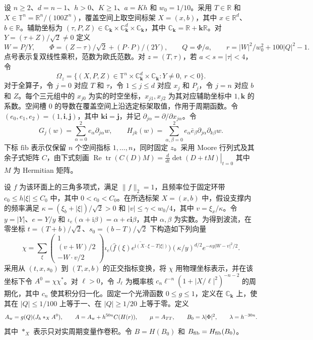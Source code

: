 设 $n\ge2$、$d=n-1$、$h>0$、$K\ge1$、$a=Kh$ 和 $w_0=1/10$。采用 $T\in\mathbb R$ 和 $X\in\mathbb T^n=\mathbb R^n/(100\mathbb Z^n)$，覆盖空间上取空间标架 $X=(x,b)$，其中 $x\in\mathbb R^d$、$b\in\mathbb R$。辅助坐标为 $(\tau,P,Z)\in\mathbb C_{\mathbf k}\times\mathbb C_{\mathbf k}^d\times\mathbb C_{\mathbf k}$，其中 $\mathbb C_{\mathbf k}=\mathbb R+\mathbf k\mathbb R$。对 $Y=(\tau+Z)/\sqrt2\ne0$ 定义
\[
 W=P/Y,\qquad \Phi=(Z-\tau)/\sqrt2+(P\cdot P)/(2Y),\qquad
 Q=\Phi/a,\qquad r=|W|^2/w_0^2+100|Q|^2-1 .
\]
点号表示复双线性乘积，范数为欧氏范数。对 $z=(T,\tau)$，若 $a<s=|\tau|<4$，令
\[
 \Omega_z=\{(X,P,Z)\in\mathbb T^n\times\mathbb C_{\mathbf k}^d\times\mathbb C_{\mathbf k}:Y\ne0,\ r<0\}.
\]
对于全算子，令 $j=0$ 对应 $T$ 和 $\tau$，令 $1\le j\le d$ 对应 $x_j$ 和 $P_j$，令 $j=n$ 对应 $b$ 和 $Z$。每个三元组中的 $x_{j0}$ 为实的时空坐标，$x_{j1},x_{j2}$ 为其对应辅助坐标中 $1,\mathbf k$ 的系数。空间槽 $0$ 的导数在覆盖空间上沿选定标架取值，作用于周期函数。令 $(e_0,e_1,e_2)=(1,\mathbf i,\mathbf j)$，其中 $\mathbf k\mathbf i=\mathbf j$，并记 $\partial_{j\alpha}=\partial/\partial x_{j\alpha}$。令
\[
 G_j(w)=\sum_{\alpha=0}^2 e_\alpha\partial_{j\alpha}w,\qquad
 H_{jk}(w)=\sum_{\alpha,\beta=0}^2 e_\alpha\bar e_\beta\partial_{j\alpha}\partial_{k\beta}w .
\]
下标 $\mathrm{fib}$ 表示仅保留 $n$ 个空间指标 $1,\ldots,n$，同时固定 $z$。采用 Moore 行列式及其余子式矩阵 $C$，由下式刻画
$\operatorname{Re}\operatorname{tr}(C(D)M)=\left.\frac{d}{dt}\det(D+tM)\right|_{t=0}$
其中 $M$ 为 Hermitian 矩阵。

设 $f$ 为该环面上的三角多项式，满足 $\|f\|_2=1$，且频率位于固定环带 $c_0\le h|\xi|\le C_0$ 中，其中 $0<c_0<C_0$。在所选标架 $X=(x,b)$ 中，假设支撑内的频率满足 $\kappa=(\xi_b+|\xi|)/\sqrt2>0$ 和 $|v|\le\gamma<w_0/4$，其中 $v=\xi_x/\kappa$。令 $y=|Y|$、$e=Y/y$ 和 $\iota_e(\alpha+\mathrm i\beta)=\alpha+e\mathbf i\beta$，其中 $\alpha,\beta$ 为实数。为得到波流，在零坐标 $t=(T+b)/\sqrt2$、$s_0=(b-T)/\sqrt2$ 下构造如下列向量
\[
 \chi=\sum_{\xi}
 \begin{pmatrix}1\\(v+W)/2\\-W\cdot v/2\end{pmatrix}
 \iota_e\!\bigl(\overline{\widehat f(\xi)e^{\mathrm i(X\cdot\xi-T|\xi|)}}\bigr)
 (\kappa/y)^{d/2}e^{-\kappa y|W-v|^2/2}.
\]
采用从 $(t,x,s_0)$ 到 $(T,x,b)$ 的正交指标变换，将 $\chi$ 用物理坐标表示，并在该坐标下令 $A^0=\chi\chi^*$。对 $\ell>0$，令 $J_\ell$ 为概率核 $c_n\ell^{-n}(1+|X/\ell|^2)^{-n-2}$ 的周期化，其中 $c_n$ 使其积分归一化。固定一个光滑函数 $0\le g\le1$，定义在 $\mathbb C_{\mathbf k}$ 上，使其在 $|Q|\le1/100$ 上等于一、在 $|Q|\ge1/20$ 上等于零。定义
\[
 A_{\rm w}=g(Q)(J_h*_X A^0),\qquad A=A_{\rm w}+h^{50n}C(H(r)),\qquad
 \mu=A_{TT},\qquad B_0=\lambda|\Phi|^2,\qquad\lambda=h^{-30n}.
\]
其中 $*_X$ 表示只对实周期变量作卷积。令 $B=H(B_0)$ 和 $B_{\rm fib}=H_{\rm fib}(B_0)$。


